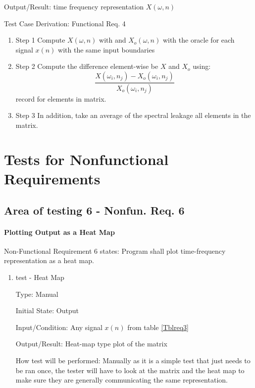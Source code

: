 \documentclass[12pt, titlepage]{article}
\begin{document}
\begin{enumerate}
Output/Result: time frequency representation $X(\omega, n)$
	
Test Case Derivation: Functional Req. 4			
					
\begin{enumerate}

\item{Step 1} Compute $X(\omega, n)$ with \progname and $X_o(\omega, n)$ with the oracle for each signal $x(n)$ with the same input boundaries
\item{Step 2} Compute the difference element-wise be $X$ and $X_o$ using:
\[ \frac{X(\omega_i, n_j) - X_o(\omega_i, n_j)}{X_o(\omega_i, n_j)} \]
record for elements in matrix.
\item{Step 3} In addition, take an average of the spectral leakage all elements in the matrix.
\end{enumerate}	
					

\end{enumerate}



\section{Tests for Nonfunctional Requirements}


\subsection{Area of testing 6 - Nonfun. Req. 6} \label{test_heatmap}
\paragraph{Plotting Output as a Heat Map}

Non-Functional Requirement 6 states: Program shall plot time-frequency representation as a heat map.

\begin{enumerate}

\item{test - Heat Map\\}

Type: Manual
					
Initial State: Output 
					
Input/Condition: Any signal $x(n)$ from table \ref{Tblreq3}
					
Output/Result: Heat-map type plot of the matrix
					
How test will be performed: Manually as it is a simple test that just needs to be ran once, the tester will have to look at the matrix and the heat map to make sure they are generally communicating the same representation. 
					
\end{enumerate}
\end{document}
